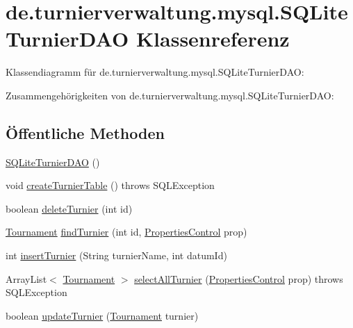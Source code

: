 \hypertarget{classde_1_1turnierverwaltung_1_1mysql_1_1_s_q_lite_turnier_d_a_o}{}\section{de.\+turnierverwaltung.\+mysql.\+S\+Q\+Lite\+Turnier\+D\+AO Klassenreferenz}
\label{classde_1_1turnierverwaltung_1_1mysql_1_1_s_q_lite_turnier_d_a_o}


Klassendiagramm für de.\+turnierverwaltung.\+mysql.\+S\+Q\+Lite\+Turnier\+D\+AO\+:


Zusammengehörigkeiten von de.\+turnierverwaltung.\+mysql.\+S\+Q\+Lite\+Turnier\+D\+AO\+:
\subsection*{Öffentliche Methoden}
\begin{DoxyCompactItemize}
\item 
\hyperlink{classde_1_1turnierverwaltung_1_1mysql_1_1_s_q_lite_turnier_d_a_o_a748b672c6062648d176cef2fc1c7db2a}{S\+Q\+Lite\+Turnier\+D\+AO} ()
\item 
void \hyperlink{classde_1_1turnierverwaltung_1_1mysql_1_1_s_q_lite_turnier_d_a_o_a7c0558c42177264d3ea035994690afe4}{create\+Turnier\+Table} ()  throws S\+Q\+L\+Exception 
\item 
boolean \hyperlink{classde_1_1turnierverwaltung_1_1mysql_1_1_s_q_lite_turnier_d_a_o_a88d8301d735b95242c69901bde4c73a2}{delete\+Turnier} (int id)
\item 
\hyperlink{classde_1_1turnierverwaltung_1_1model_1_1_tournament}{Tournament} \hyperlink{classde_1_1turnierverwaltung_1_1mysql_1_1_s_q_lite_turnier_d_a_o_a7f0941d863e411990706b1e4b3fa8a88}{find\+Turnier} (int id, \hyperlink{classde_1_1turnierverwaltung_1_1control_1_1_properties_control}{Properties\+Control} prop)
\item 
int \hyperlink{classde_1_1turnierverwaltung_1_1mysql_1_1_s_q_lite_turnier_d_a_o_a4a07f8b8c44b6917eec9ddf00ef9ea64}{insert\+Turnier} (String turnier\+Name, int datum\+Id)
\item 
Array\+List$<$ \hyperlink{classde_1_1turnierverwaltung_1_1model_1_1_tournament}{Tournament} $>$ \hyperlink{classde_1_1turnierverwaltung_1_1mysql_1_1_s_q_lite_turnier_d_a_o_ad5e5a2283f2681cd01e4e18f9970b80a}{select\+All\+Turnier} (\hyperlink{classde_1_1turnierverwaltung_1_1control_1_1_properties_control}{Properties\+Control} prop)  throws S\+Q\+L\+Exception 
\item 
boolean \hyperlink{classde_1_1turnierverwaltung_1_1mysql_1_1_s_q_lite_turnier_d_a_o_a32997c82c2395a9b38716be40c1a0e35}{update\+Turnier} (\hyperlink{classde_1_1turnierverwaltung_1_1model_1_1_tournament}{Tournament} turnier)
\end{DoxyCompactItemize}



